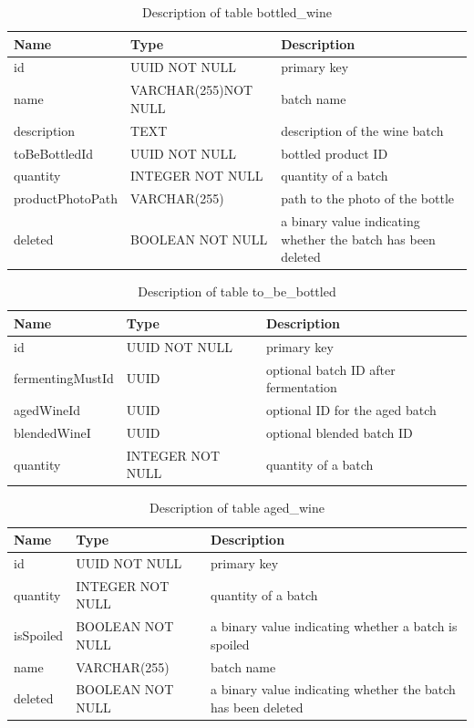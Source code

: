 \begin{table}[th]
	\centering
	\caption{Description of table bottled\_wine}
	\begin{tabular}{|m{}|m{}|m{}|}
		\hline
		Name & Type & Description  \\ \hline
		id & UUID NOT NULL & primary key\\ \hline
		name & VARCHAR(255)\newline NOT NULL & batch name\\ \hline
		description & TEXT & description of the wine batch\\ \hline
		toBeBottledId & UUID NOT NULL & bottled product ID\\ \hline
		quantity & INTEGER NOT NULL & quantity of a batch\\ \hline
		productPhotoPath & VARCHAR(255) & path to the photo of the bottle\\ \hline
		deleted & BOOLEAN NOT NULL & a binary value indicating whether the batch has been deleted\\ \hline
	\end{tabular}
\end{table}
\begin{table}[th]
	\centering
	\caption{Description of table to\_be\_bottled}
	\begin{tabular}{|m{}|m{}|m{}|}
		\hline
		Name & Type & Description  \\ \hline
		id & UUID NOT NULL & primary key\\ \hline
		fermentingMustId & UUID & optional batch ID after fermentation\\ \hline
		agedWineId & UUID & optional ID for the aged batch\\ \hline
		blendedWineI & UUID & optional blended batch ID\\ \hline
		quantity & INTEGER NOT NULL & quantity of a batch\\ \hline
	\end{tabular}
\end{table}
\begin{table}[th]
	\centering
	\caption{Description of table aged\_wine}
	\begin{tabular}{|m{}|m{}|m{}|}
		\hline
		Name & Type & Description  \\ \hline
		id & UUID NOT NULL & primary key\\ \hline
		quantity & INTEGER NOT NULL & quantity of a batch\\ \hline
		isSpoiled & BOOLEAN NOT NULL & a binary value indicating whether a batch is spoiled\\ \hline
		name & VARCHAR(255) & batch name\\ \hline
		deleted & BOOLEAN NOT NULL & a binary value indicating whether the batch has been deleted\\ \hline
	\end{tabular}
\end{table}
